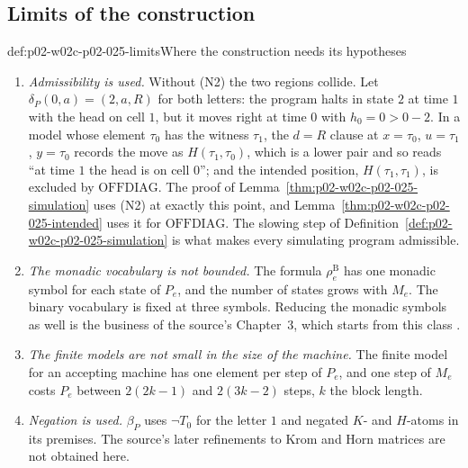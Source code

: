 \subsection{Limits of the construction}
\label{sec:p02-w02c-p02-025-limits}

\begin{hbwarning}{def:p02-w02c-p02-025-limits}{Where the construction needs its hypotheses}
\begin{enumerate}
\item \emph{Admissibility is used.}  Without (N2) the two regions collide.
  Let \(\delta_P(0,a)=(2,a,R)\) for both letters: the program halts in state
  \(2\) at time \(1\) with the head on cell \(1\), but it moves right at time
  \(0\) with \(h_0=0>0-2\).  In a model whose element \(\tau_0\) has the witness
  \(\tau_1\), the \(d=R\) clause at \(x=\tau_0\), \(u=\tau_1\), \(y=\tau_0\)
  records the move as \(H(\tau_1,\tau_0)\), which is a lower pair and so reads
  ``at time \(1\) the head is on cell \(0\)''; and the intended position,
  \(H(\tau_1,\tau_1)\), is excluded by \(\mathrm{OFFDIAG}\).  The proof of
  Lemma~\ref{thm:p02-w02c-p02-025-simulation} uses (N2) at exactly this point,
  and Lemma~\ref{thm:p02-w02c-p02-025-intended} uses it for \(\mathrm{OFFDIAG}\).
  The slowing step of Definition~\ref{def:p02-w02c-p02-025-simulation} is what
  makes every simulating program admissible.
\item \emph{The monadic vocabulary is not bounded.}  The formula
  \(\rho^{\mathrm B}_e\) has one monadic symbol for each state of \(P_e\), and
  the number of states grows with \(M_e\).  The binary vocabulary is fixed at
  three symbols.  Reducing the monadic symbols as well is the business of the
  source's Chapter~3, which starts from this class
  \cite[Sect.~3.2, pp.~115--116]{BorgerGradelGurevich1997}.
\item \emph{The finite models are not small in the size of the machine.}  The
  finite model for an accepting machine has one element per step of
  \(P_e\), and one step of \(M_e\) costs \(P_e\) between \(2(2k-1)\) and
  \(2(3k-2)\) steps, \(k\) the block length.
\item \emph{Negation is used.}  \(\beta_P\) uses \(\neg T_0\) for the letter
  \(1\) and negated \(K\)- and \(H\)-atoms in its premises.  The source's later
  refinements to Krom and Horn matrices
  \cite[Sect.~2.1.2, Exercise~2.1.37, p.~37]{BorgerGradelGurevich1997} are not
  obtained here.
\end{enumerate}
\end{hbwarning}

